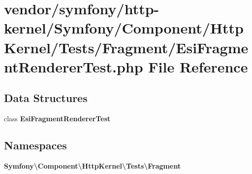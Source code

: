 \section{vendor/symfony/http-\/kernel/\+Symfony/\+Component/\+Http\+Kernel/\+Tests/\+Fragment/\+Esi\+Fragment\+Renderer\+Test.php File Reference}
\label{_esi_fragment_renderer_test_8php}
\subsection*{Data Structures}
\begin{DoxyCompactItemize}
\item 
class {\bf Esi\+Fragment\+Renderer\+Test}
\end{DoxyCompactItemize}
\subsection*{Namespaces}
\begin{DoxyCompactItemize}
\item 
 {\bf Symfony\textbackslash{}\+Component\textbackslash{}\+Http\+Kernel\textbackslash{}\+Tests\textbackslash{}\+Fragment}
\end{DoxyCompactItemize}
